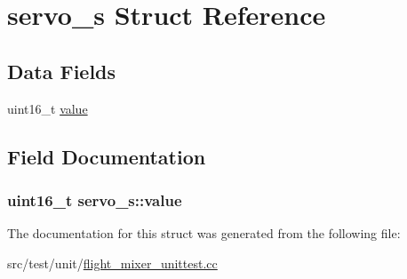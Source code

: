 \hypertarget{structservo__s}{\section{servo\+\_\+s Struct Reference}
\label{structservo__s}
}
\subsection*{Data Fields}
\begin{DoxyCompactItemize}
\item 
uint16\+\_\+t \hyperlink{structservo__s_a23af5bbe2e5e7c5894a2009a5eefcc7c}{value}
\end{DoxyCompactItemize}


\subsection{Field Documentation}
\hypertarget{structservo__s_a23af5bbe2e5e7c5894a2009a5eefcc7c}{
\subsubsection[{value}]{\setlength{\rightskip}{0pt plus 5cm}uint16\+\_\+t servo\+\_\+s\+::value}}\label{structservo__s_a23af5bbe2e5e7c5894a2009a5eefcc7c}


The documentation for this struct was generated from the following file\+:\begin{DoxyCompactItemize}
\item 
src/test/unit/\hyperlink{flight__mixer__unittest_8cc}{flight\+\_\+mixer\+\_\+unittest.\+cc}\end{DoxyCompactItemize}
